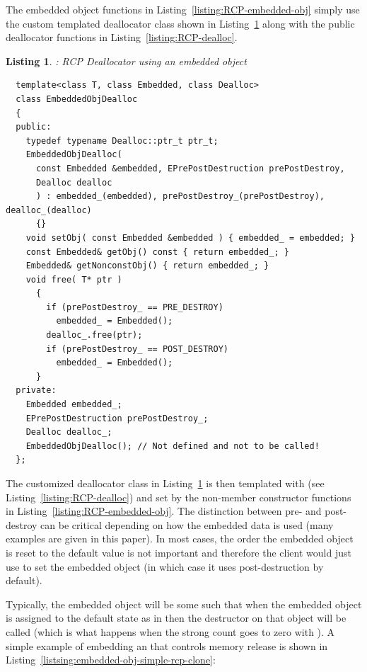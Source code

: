 \documentclass[pdf,ps2pdf,11pt]{SANDreport}
\newtheorem{listing}{Listing}
\begin{document}
The embedded object functions in
Listing~\ref{listing:RCP-embedded-obj} simply use the custom templated
deallocator class {} shown in
Listing~\ref{listing:RCP-EmbeddedObjDealloc} along with the public
deallocator functions in Listing~\ref{listing:RCP-dealloc}.


\begin{listing}: RCP Deallocator using an embedded object \\
\label{listing:RCP-EmbeddedObjDealloc}
{\small\begin{verbatim}
  template<class T, class Embedded, class Dealloc>
  class EmbeddedObjDealloc
  {
  public:
    typedef typename Dealloc::ptr_t ptr_t;
    EmbeddedObjDealloc(
      const Embedded &embedded, EPrePostDestruction prePostDestroy,
      Dealloc dealloc
      ) : embedded_(embedded), prePostDestroy_(prePostDestroy), dealloc_(dealloc)
      {}
    void setObj( const Embedded &embedded ) { embedded_ = embedded; }
    const Embedded& getObj() const { return embedded_; }
    Embedded& getNonconstObj() { return embedded_; }
    void free( T* ptr )
      {
        if (prePostDestroy_ == PRE_DESTROY)
          embedded_ = Embedded();
        dealloc_.free(ptr);
        if (prePostDestroy_ == POST_DESTROY)
          embedded_ = Embedded();
      }
  private:
    Embedded embedded_;
    EPrePostDestruction prePostDestroy_;
    Dealloc dealloc_;
    EmbeddedObjDealloc(); // Not defined and not to be called!
  };
\end{verbatim}}
\end{listing}


The customized deallocator class in
Listing~\ref{listing:RCP-EmbeddedObjDealloc} is then templated with
{} (see Listing~\ref{listing:RCP-dealloc}) and set
by the non-member constructor functions in
Listing~\ref{listing:RCP-embedded-obj}.  The distinction between pre-
and post-destroy can be critical depending on how the embedded data is
used (many examples are given in this paper).  In most cases, the
order the embedded object is reset to the default value is not
important and therefore the client would just use
{} to set the embedded object (in which
case it uses post-destruction by default).

Typically, the embedded object will be some {} such that when
the embedded object is assigned to the default state as in
{} then the destructor on that object
will be called (which is what happens when the strong count goes to
zero with {}).  A simple example of embedding an {}
that controls memory release is shown in
Listing~\ref{listsing:embedded-obj-simple-rcp-clone}:
\end{document}
